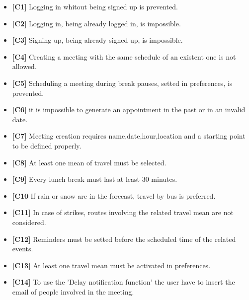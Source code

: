 \begin{itemize}
		\item \textbf{[\hypertarget{C1}{C1}]} Logging in whitout being signed up is prevented. 
		\item \textbf{[\hypertarget{C2}{C2}]} Logging in, being already logged in, is impossible. 
		\item \textbf{[\hypertarget{C3}{C3}]} Signing up, being already signed up, is impossible.
		\item \textbf{[\hypertarget{C4}{C4}]} Creating a meeting with the same schedule of an existent one is not allowed. 
		\item \textbf{[\hypertarget{C5}{C5}]} Scheduling a meeting during break pauses, setted in preferences, is prevented. 
		\item \textbf{[\hypertarget{C6}{C6}]} it is impossible to generate an appointment in the past or in an invalid date. 
		\item \textbf{[\hypertarget{C7}{C7}]} Meeting creation requires name,date,hour,location and a starting point to be defined properly.
		\item \textbf{[\hypertarget{C8}{C8}]} At least one mean of travel must be selected.
		\item \textbf{[\hypertarget{C9}{C9}]} Every lunch break must last at least 30 minutes.
		\item \textbf{[\hypertarget{C10}{C10}} If rain or snow are in the forecast, travel by bus is preferred. 
		\item \textbf{[\hypertarget{C11}{C11}]} In case of strikes, routes involving the related travel mean are not considered. 
		\item \textbf{[\hypertarget{C12}{C12}]} Reminders must be setted before the scheduled time of the related events.
		\item \textbf{[\hypertarget{C13}{C13}]} At least one travel mean must be activated in preferences.
		\item \textbf{[\hypertarget{C14}{C14}]} To use the 'Delay notification function' the user have to insert the email of people involved in the meeting.
	\end{itemize}
